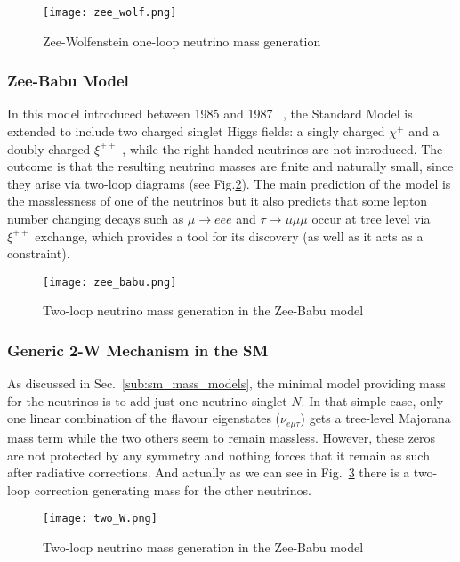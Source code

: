 \begin{figure}[!htb]
    \centering
    \texttt{[image: zee\_wolf.png]}
    \label{fig:zee_wofl}
\caption[]{Zee-Wolfenstein one-loop neutrino mass generation}
\end{figure}

\subsubsection{Zee-Babu Model}


In this model introduced between 1985 and 1987~\cite{Zee:1985id, Babu:1988ki} , the Standard Model is
extended to include two charged singlet Higgs fields: a singly charged $\chi ^+$ and a doubly charged $\xi ^{++}$ , while the right-handed neutrinos are not introduced. The outcome is that the resulting neutrino masses are finite and naturally small, since they arise via two-loop diagrams (see Fig.\ref{fig:zee_babu}). The main prediction of the model is the masslessness of one of the neutrinos but it also predicts that some lepton
number changing decays such as $\mu \to eee$ and $\tau \to \mu \mu \mu$ occur at tree level via $\xi ^{++}$ exchange, which provides a tool for its discovery (as well as it acts as a constraint).
\begin{figure}[!htb]
    \centering
    \texttt{[image: zee\_babu.png]}
    \label{fig:zee_babu}
\caption[]{Two-loop neutrino mass generation in the Zee-Babu model}
\end{figure}

\subsubsection{Generic 2-W Mechanism in the SM}
As discussed in Sec.~\ref{sub:sm_mass_models}, the minimal model providing mass for the neutrinos is to add just one neutrino singlet $N$. In that simple case, only one linear combination of the flavour eigenstates ($\nu _{e \mu \tau}$) gets a tree-level Majorana mass term while the two others seem to remain massless. However, these zeros are not protected by any symmetry and nothing forces that it remain as such after radiative corrections. And actually as we can see in Fig.~\ref{fig:two_W} there is a two-loop correction generating mass for the other neutrinos. 
\begin{figure}[!htb]
    \centering
    \texttt{[image: two\_W.png]}
    \label{fig:two_W}
\caption[]{Two-loop neutrino mass generation in the Zee-Babu model}
\end{figure}

